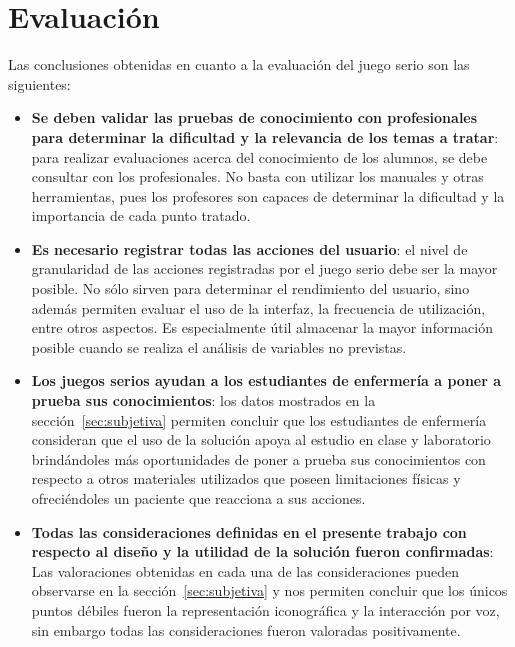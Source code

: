 \section{Evaluación}

Las conclusiones obtenidas en cuanto a la evaluación del juego serio son las 
siguientes:

\begin{itemize}

\item \textbf{Se deben validar las pruebas de conocimiento con profesionales para
        determinar la dificultad y la relevancia de los temas a tratar}: para
    realizar evaluaciones acerca del conocimiento de los alumnos, se debe
    consultar con los profesionales. No basta con utilizar los manuales y otras
    herramientas, pues los profesores son capaces de determinar la dificultad y
    la importancia de cada punto tratado.

\item \textbf{Es necesario registrar todas las acciones del usuario}: el nivel
    de granularidad de las acciones registradas por el juego serio debe ser la
    mayor posible. No sólo sirven para determinar el rendimiento del usuario,
    sino además permiten evaluar el uso de la interfaz, la frecuencia de
    utilización, entre otros aspectos. Es especialmente útil almacenar la mayor
    información posible cuando se realiza el análisis de variables no previstas.

\item \textbf{Los juegos serios ayudan a los estudiantes de enfermería a poner a
        prueba sus conocimientos}: los datos mostrados en la
    sección~\ref{sec:subjetiva} permiten concluir que los estudiantes de
    enfermería consideran que el uso de la solución apoya al estudio en clase y
    laboratorio brindándoles más oportunidades de poner a prueba sus
    conocimientos con respecto a otros materiales utilizados que poseen
    limitaciones físicas y ofreciéndoles un paciente que reacciona a sus
    acciones. 

\item \textbf{Todas las consideraciones definidas en el presente trabajo con respecto
        al diseño y la utilidad de la solución fueron confirmadas}: Las
    valoraciones obtenidas en cada una de las consideraciones pueden observarse en la
    sección~\ref{sec:subjetiva} y nos permiten concluir que los únicos puntos
    débiles fueron la representación iconográfica y la interacción por voz, sin
    embargo todas las consideraciones fueron valoradas positivamente.

\end{itemize}

